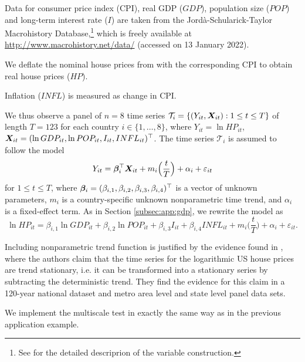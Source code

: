 \documentclass[a4paper,12pt]{article}
\makeatletter
\renewcommand{\eqref}[1]{\tagform@{\ref{#1}}}
\makeatother
\begin{document}
Data for consumer price index (CPI), real GDP ($GDP$), population size ($POP$) and long-term interest rate ($I$) are taken from the Jordà-Schularick-Taylor Macrohistory Database,\footnote{See \cite{Jorda2017} for the detailed descriprion of the variable construction.} which is freely available at \linebreak \url{http://www.macrohistory.net/data/} (accessed on 13 January 2022).

We deflate the nominal house prices from  \cite{Knoll2017} with the corresponding CPI to obtain real house prices ($HP$). 

Inflation ($INFL$) is measured as change in CPI.

We thus observe a panel of $n = 8$ time series $\mathcal{T}_i = \{(Y_{it}, \boldsymbol{X}_{it}): 1 \le t \le T \}$ of length \linebreak$T = 123$ for each country $i \in \{1,\ldots,8\}$, where $Y_{it} = \ln HP_{it}$, \linebreak $\boldsymbol{X}_{it} = (\ln GDP_{it}, \ln POP_{it}, I_{it}, INFL_{it})^\top$. The time series $\mathcal{T}_i$ is assumed to follow the model 
\begin{equation}\label{eq:model:app3}
Y_{it} = \bm{\beta}^\top_i \boldsymbol{X}_{it} + m_i \Big( \frac{t}{T} \Big) + \alpha_i + \varepsilon_{it} 
\end{equation}
for $1 \le t \le T$, where $\bm{\beta}_i = (\beta_{i, 1}, \beta_{i, 2}, \beta_{i, 3}, \beta_{i, 4})^\top$ is a vector of unknown parameters, $m_i$ is a country-specific unknown nonparametric time trend, and $\alpha_i$ is a fixed-effect term. As in Section \ref{subsec:app:gdp}, we rewrite the model \eqref{eq:model:app2} as
\begin{equation}\label{eq:model:app4}
\ln HP_{it} = \beta_{i, 1} \ln GDP_{it} + \beta_{i, 2} \ln POP_{it} + \beta_{i, 3} I_{it} + \beta_{i, 4} INFL_{it} + m_i \Big( \frac{t}{T} \Big) + \alpha_i + \varepsilon_{it}.
\end{equation}

Including nonparametric trend function is justified by the evidence found in \cite{Zhang2016}, where the authors claim that the time series for the logarithmic US house prices are trend stationary, i.e. it can be transformed into a stationary series by subtracting the deterministic trend. They find the evidence for this claim in a 120-year national dataset and metro area level and state level panel data sets. 

We implement the multiscale test in exactly the same way as in the previous application example.
\end{document}
